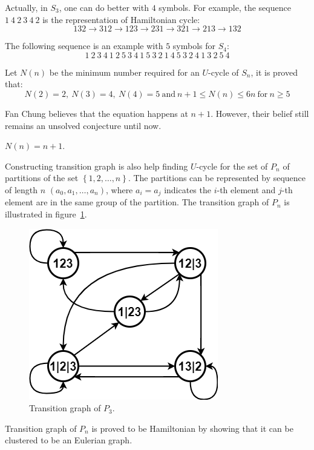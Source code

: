 Actually, in $S_{3}$, one can do better with $4$ symbols. For example, the sequence $1\ 4\ 2\ 3\ 4\ 2$ is the representation of Hamiltonian cycle:
\[132\rightarrow312\rightarrow123\rightarrow231\rightarrow321\rightarrow213\rightarrow132\]

The following sequence is an example with $5$ symbols for $S_{4}$:
\[1\ 2\ 3\ 4\ 1\ 2\ 5\ 3\ 4\ 1\ 5\ 3\ 2\ 1\ 4\ 5\ 3\ 2\ 4\ 1\ 3\ 2\ 5\ 4 \]

Let $N(n)$ be the minimum number required for an $U$-cycle of $S_{n}$, it is proved that:
\[N(2)=2,\ N(3) = 4,\ N(4)=5\ \mathrm{and}\ n+1\leq N(n)\leq 6n\ \mathrm{for}\ n\geq5\]

Fan Chung believes that the equation happens at $n+1$. However, their belief still remains an unsolved conjecture until now.
\begin{conjecture}
    $N(n)=n+1$.
\end{conjecture}

Constructing transition graph is also help finding $U$-cycle for the set of $P_{n}$ of partitions of the set $\left\{1,2,\ldots,n\right\}$. The partitions can be represented by sequence of length $n$ $(a_{0},a_{1},\ldots,a_{n})$, where $a_{i}=a_{j}$ indicates the $i$-th element and $j$-th element are in the same group of the partition. The transition graph of $P_{n}$ is illustrated in figure~\ref{fig:P3_graph}.

\begin{figure}[htbp]
    \centering
    \includegraphics[scale=0.5]{fig/partitions.png}
    \caption{Transition graph of $P_{3}$.}
    \label{fig:P3_graph}
\end{figure}

Transition graph of $P_{n}$ is proved to be Hamiltonian by showing that it can be clustered to be an Eulerian graph. 

